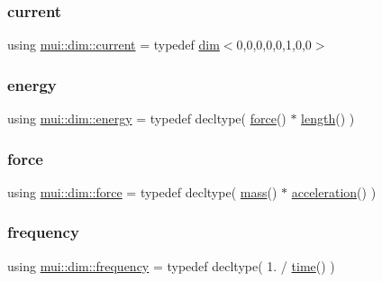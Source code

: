 \mbox{\label{namespacemui_1_1dim_ac15a72100f3e57d6c9419fca5501b456}} 
\subsubsection{\texorpdfstring{current}{current}}
{\footnotesize\ttfamily using \hyperlink{namespacemui_1_1dim_ac15a72100f3e57d6c9419fca5501b456}{mui\+::dim\+::current} = typedef \hyperlink{structmui_1_1dim_1_1dim}{dim}$<$0,0,0,0,0,1,0,0$>$}

\mbox{\label{namespacemui_1_1dim_a00e1931b1f70586e0983e317bfafb793}} 
\subsubsection{\texorpdfstring{energy}{energy}}
{\footnotesize\ttfamily using \hyperlink{namespacemui_1_1dim_a00e1931b1f70586e0983e317bfafb793}{mui\+::dim\+::energy} = typedef decltype( \hyperlink{namespacemui_1_1dim_a68ab4d0da68b3ea4bf71656c271fa4a0}{force}() $\ast$ \hyperlink{namespacemui_1_1dim_ade9a9679bc46e16322ef419974faebe6}{length}() )}

\mbox{\label{namespacemui_1_1dim_a68ab4d0da68b3ea4bf71656c271fa4a0}} 
\subsubsection{\texorpdfstring{force}{force}}
{\footnotesize\ttfamily using \hyperlink{namespacemui_1_1dim_a68ab4d0da68b3ea4bf71656c271fa4a0}{mui\+::dim\+::force} = typedef decltype( \hyperlink{namespacemui_1_1dim_a7b17424f4316e37d7970ee09857ccddf}{mass}() $\ast$ \hyperlink{namespacemui_1_1dim_aec150f5d30ea4484d99cbfaf1d6f80c9}{acceleration}() )}

\mbox{\label{namespacemui_1_1dim_a2b1533b4a87cb5275032e7279211e793}} 
\subsubsection{\texorpdfstring{frequency}{frequency}}
{\footnotesize\ttfamily using \hyperlink{namespacemui_1_1dim_a2b1533b4a87cb5275032e7279211e793}{mui\+::dim\+::frequency} = typedef decltype( 1. / \hyperlink{namespacemui_1_1dim_a3d3a0014025f1c2c0dd7418791928500}{time}() )}

